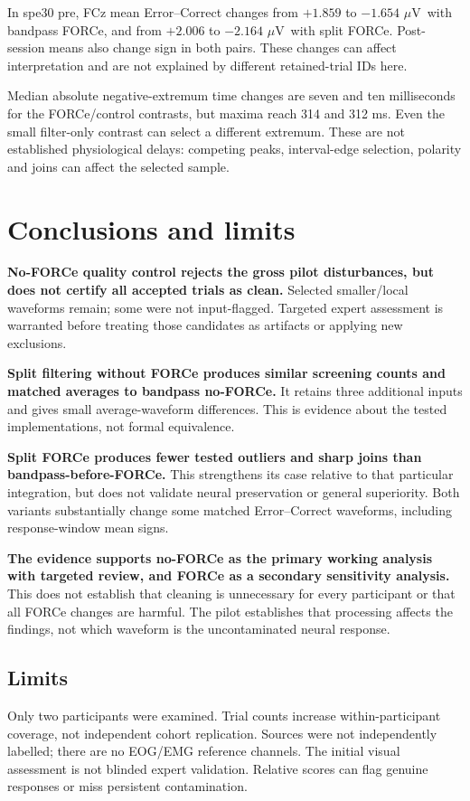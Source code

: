\documentclass[11pt,a4paper]{article}
\newcommand{\uv}{\ensuremath{\mu\mathrm{V}}}
\begin{document}
In spe30 pre, FCz mean Error--Correct changes from $+1.859$ to $-1.654$ \uv\ with bandpass FORCe, and from $+2.006$ to $-2.164$ \uv\ with split FORCe. Post-session means also change sign in both pairs. These changes can affect interpretation and are not explained by different retained-trial IDs here.

Median absolute negative-extremum time changes are seven and ten milliseconds for the FORCe/control contrasts, but maxima reach 314 and 312 ms. Even the small filter-only contrast can select a different extremum. These are not established physiological delays: competing peaks, interval-edge selection, polarity and joins can affect the selected sample.
\clearpage
\section{Conclusions and limits}
\textbf{No-FORCe quality control rejects the gross pilot disturbances, but does not certify all accepted trials as clean.} Selected smaller/local waveforms remain; some were not input-flagged. Targeted expert assessment is warranted before treating those candidates as artifacts or applying new exclusions.

\textbf{Split filtering without FORCe produces similar screening counts and matched averages to bandpass no-FORCe.} It retains three additional inputs and gives small average-waveform differences. This is evidence about the tested implementations, not formal equivalence.

\textbf{Split FORCe produces fewer tested outliers and sharp joins than bandpass-before-FORCe.} This strengthens its case relative to that particular integration, but does not validate neural preservation or general superiority. Both variants substantially change some matched Error--Correct waveforms, including response-window mean signs.

\textbf{The evidence supports no-FORCe as the primary working analysis with targeted review, and FORCe as a secondary sensitivity analysis.} This does not establish that cleaning is unnecessary for every participant or that all FORCe changes are harmful. The pilot establishes that processing affects the findings, not which waveform is the uncontaminated neural response.
\subsection{Limits}
Only two participants were examined. Trial counts increase within-participant coverage, not independent cohort replication. Sources were not independently labelled; there are no EOG/EMG reference channels. The initial visual assessment is not blinded expert validation. Relative scores can flag genuine responses or miss persistent contamination.
\end{document}
